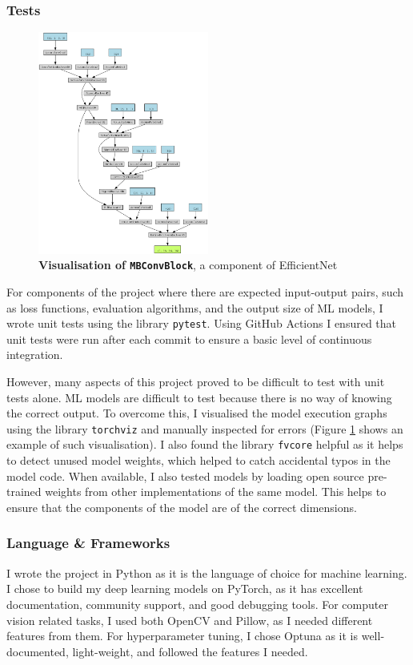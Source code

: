 \documentclass[12pt,a4paper,twoside,openany]{report}
\begin{document}
\subsubsection{Tests}
\begin{figure}
    \centering
    \includegraphics[width=0.5\textwidth]{figs/prep/torchviz_example.png.png}
    \caption{\textbf{Visualisation of \texttt{MBConvBlock}}, a component of EfficientNet \cite{tan_efficientnet_2020}}
    \label{fig: mbconvblock}
\end{figure}
For components of the project where there are expected input-output pairs, such as loss functions, evaluation algorithms, and the output size of ML models, I wrote unit tests using the library \verb|pytest|. Using GitHub Actions I ensured that unit tests were run after each commit to ensure a basic level of continuous integration. 

However, many aspects of this project proved to be difficult to test with unit tests alone. ML models are difficult to test because there is no way of knowing the correct output. To overcome this, I visualised the model execution graphs using the library \verb|torchviz| and manually inspected for errors (Figure \ref{fig: mbconvblock} shows an example of such visualisation). I also found the library \verb|fvcore| helpful as it helps to detect unused model weights, which helped to catch accidental typos in the model code. When available, I also tested models by loading open source pre-trained weights from other implementations of the same model. This helps to ensure that the components of the model are of the correct dimensions.


\subsubsection{Language \& Frameworks}
I wrote the project in Python as it is the language of choice for machine learning. I chose to build my deep learning models on PyTorch, as it has excellent documentation, community support, and good debugging tools. For computer vision related tasks, I used both OpenCV and Pillow, as I needed different features from them. For hyperparameter tuning, I chose Optuna as it is well-documented, light-weight, and followed the features I needed.
\end{document}
